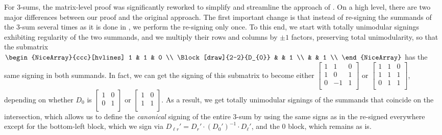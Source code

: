For 3-sums, the matrix-level proof was significantly reworked to simplify and streamline the approach of \cite{Truemper2016}. On a high level, there are two major differences between our proof and the original approach. The first important change is that instead of re-signing the summands of the 3-sum several times as it is done in \cite{Truemper2016}, we perform the re-signing only once. To this end, we start with totally unimodular signings exhibiting regularity of the two summands, and we multiply their rows and columns by $\pm 1$ factors, preserving total unimodularity, so that the submatrix $
\begin{NiceArray}{ccc}[hvlines]
    1 & 1 & 0 \\
    \Block[draw]{2-2}{D_{0}} & & 1 \\
    & & 1 \\
\end{NiceArray}
$ has the same signing in both summands. In fact, we can get the signing of this submatrix to become either $
\begin{bmatrix}
    1 & 1 & 0 \\
    1 & 0 & 1 \\
    0 & -1 & 1 \\
\end{bmatrix}
$ or $
\begin{bmatrix}
    1 & 1 & 0 \\
    1 & 1 & 1 \\
    0 & 1 & 1 \\
\end{bmatrix}
$, depending on whether $D_{0}$ is $\begin{bmatrix} 1 & 0 \\ 0 & 1 \\ \end{bmatrix}$ or $\begin{bmatrix} 1 & 0 \\ 1 & 1 \\ \end{bmatrix}$. As a result, we get totally unimodular signings of the summands that coincide on the intersection, which allows us to define the \emph{canonical} signing of the entire 3-sum by using the same signs as in the re-signed everywhere except for the bottom-left block, which we sign via $D_{\ell r}' = D_{r}' \cdot (D_{0}')^{-1} \cdot D_{\ell}'$, and the $0$ block, which remains as is.


